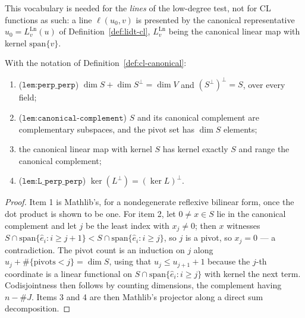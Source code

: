 This vocabulary is needed for the \emph{lines} of the low-degree test, not for CL functions as
such: a line $\ell(u_0, v)$ is presented by the canonical representative
$u_0 = L^{\mathrm{Ln}}_v(u)$ of Definition~\ref{def:lidt-cl}, $L^{\mathrm{Ln}}_v$ being the
canonical linear map with kernel $\mathrm{span}\{v\}$.

\begin{lemma}
\label{lem:cl-canonical}
\leanok
With the notation of Definition~\ref{def:cl-canonical}:
\begin{enumerate}
\item ($\texttt{lem:perp\_perp}$) $\dim S + \dim S^\perp = \dim V$ and
  $(S^\perp)^\perp = S$, over every field;
\item ($\texttt{lem:canonical-complement}$) $S$ and its canonical complement are
  complementary subspaces, and the pivot set has $\dim S$ elements;
\item the canonical linear map with kernel $S$ has kernel exactly $S$ and range the canonical
  complement;
\item ($\texttt{lem:L\_perp\_perp}$) $\ker(L^\perp) = (\ker L)^\perp$.
\end{enumerate}
\end{lemma}

\begin{proof}
\leanok
{}
Item 1 is Mathlib's, for a nondegenerate reflexive bilinear form, once the dot product is shown
to be one. For item 2, let $0 \neq x \in S$ lie in the canonical complement and let $j$ be the
least index with $x_j \neq 0$; then $x$ witnesses $S \cap \mathrm{span}\{\hat e_i : i \geq
j+1\} < S \cap \mathrm{span}\{\hat e_i : i \geq j\}$, so $j$ is a pivot, so $x_j = 0$ --- a
contradiction. The pivot count is an induction on $j$ along $u_j + \#\{\text{pivots} < j\} =
\dim S$, using that $u_j \leq u_{j+1} + 1$ because the $j$-th coordinate is a linear functional
on $S \cap \mathrm{span}\{\hat e_i : i \geq j\}$ with kernel the next term. Codisjointness
then follows by counting dimensions, the complement having $n - \#J$. Items 3 and 4 are then
Mathlib's projector along a direct sum decomposition.
\end{proof}

